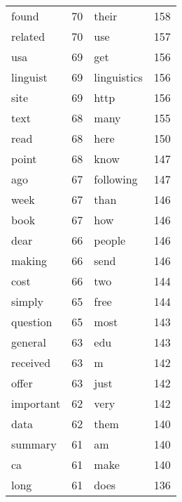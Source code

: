 \documentclass[10pt, a4paper]{article}
\begin{document}
\begin{longtable}{l c l c}
found & 70 & their & 158 \\
related & 70 & use & 157 \\
usa & 69 & get & 156 \\
linguist & 69 & linguistics & 156 \\
site & 69 & http & 156 \\
text & 68 & many & 155 \\
read & 68 & here & 150 \\
point & 68 & know & 147 \\
ago & 67 & following & 147 \\
week & 67 & than & 146 \\
book & 67 & how & 146 \\
dear & 66 & people & 146 \\
making & 66 & send & 146 \\
cost & 66 & two & 144 \\
simply & 65 & free & 144 \\
question & 65 & most & 143 \\
general & 63 & edu & 143 \\
received & 63 & m & 142 \\
offer & 63 & just & 142 \\
important & 62 & very & 142 \\
data & 62 & them & 140 \\
summary & 61 & am & 140 \\
ca & 61 & make & 140 \\
long & 61 & does & 136 \\
\end{longtable}
\end{document}
